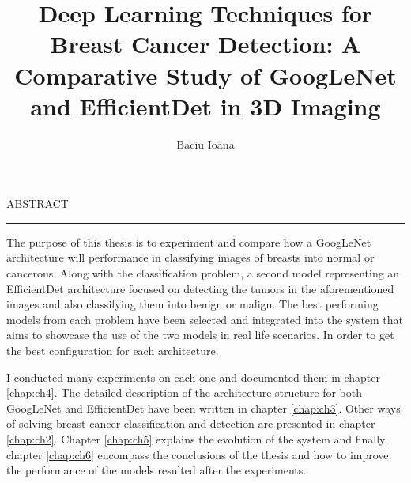 \documentclass[12pt]{report}
\begin{document}
\title{Deep Learning Techniques for Breast Cancer Detection: A Comparative Study of GoogLeNet and EfficientDet in 3D Imaging}					   
\author{Baciu Ioana}											
				
\maketitle


\newpage
\thispagestyle{empty}
\mbox{}
\newpage
{} 

\cleardoublepage
ABSTRACT
\vspace{0.5cm}	
\hrule
\vspace{0.5cm}	


The purpose of this thesis is to experiment and compare how a GoogLeNet architecture will performance in classifying images of breasts into normal or cancerous. Along with the classification problem, a second model representing an EfficientDet architecture focused on detecting the tumors in the aforementioned images and also classifying them into benign or malign. The best performing models from each problem have been selected and integrated into the system that aims to showcase the use of the two models in real life scenarios. In order to get the best configuration for each architecture.

I conducted many experiments on each one and documented them in chapter \ref{chap:ch4}. The detailed description of the architecture structure for both GoogLeNet and EfficientDet have been written in chapter \ref{chap:ch3}. Other ways of solving breast cancer classification and detection are presented in chapter \ref{chap:ch2}. Chapter \ref{chap:ch5} explains the evolution of the system and finally, chapter \ref{chap:ch6} encompass the conclusions of the thesis and how to improve the performance of the models resulted after the experiments.

\tableofcontents


\newpage
{}













\end{document}
